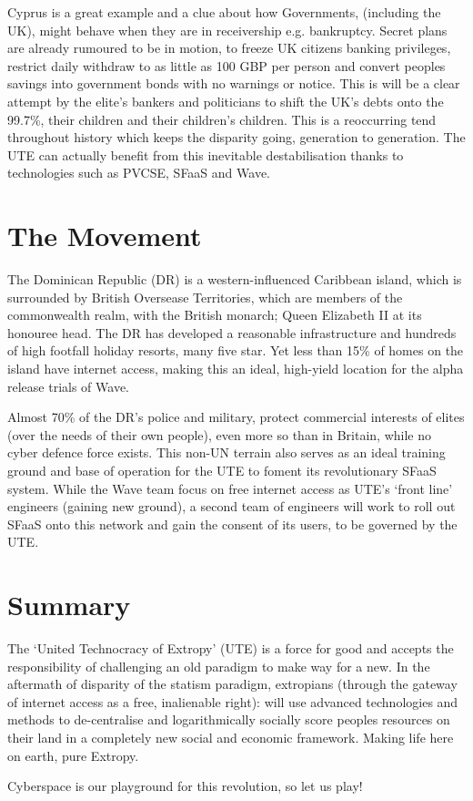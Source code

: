 \documentclass[letterpaper,10pt,openany,oneside,english]{sphinxmanual}
\begin{document}
Cyprus is a great example and a clue about how Governments, (including the UK), might behave when they are in receivership e.g. bankruptcy. Secret plans are already rumoured to be in motion, to freeze UK citizens banking privileges, restrict daily withdraw to as little as 100 GBP per person and convert peoples savings into government bonds with no warnings or notice. This is will be a clear attempt by the elite’s bankers and politicians to shift the UK’s debts onto the 99.7\%, their children and their children’s children. This is a reoccurring tend throughout history which keeps the disparity going, generation to generation. The UTE can actually benefit from this inevitable destabilisation thanks to technologies such as PVCSE, SFaaS and Wave.


\chapter{The Movement}
\label{\detokenize{movement:the-movement}}\label{\detokenize{movement::doc}}
The Dominican Republic (DR) is a western-influenced Caribbean island, which is surrounded by British Oversease Territories, which are members of the commonwealth realm, with the British monarch; Queen Elizabeth II at its honouree head. The DR has developed a reasonable infrastructure and hundreds of high footfall holiday resorts, many five star. Yet less than 15\% of homes on the island have internet access, making this an ideal, high-yield location for the alpha release trials of Wave.

Almost 70\% of the DR’s police and military, protect commercial interests of elites (over the needs of their own people), even more so than in Britain, while no cyber defence force exists. This non-UN terrain also serves as an ideal training ground and base of operation for the UTE to foment its revolutionary SFaaS system. While the Wave team focus on free internet access as UTE’s ‘front line’ engineers (gaining new ground), a second team of engineers will work to roll out SFaaS onto this network and gain the consent of its users, to be governed by the UTE.


\chapter{Summary}
\label{\detokenize{summary:summary}}\label{\detokenize{summary::doc}}
The ‘United Technocracy of Extropy’ (UTE) is a force for good and accepts the responsibility of challenging an old paradigm to make way for a new. In the aftermath of disparity of the statism paradigm, extropians (through the gateway of internet access as a free, inalienable right): will use advanced technologies and methods to de-centralise and logarithmically socially score peoples resources on their land in a completely new social and economic framework. Making life here on earth, pure Extropy.

Cyberspace is our playground for this revolution, so let us play!


\chapter{}
\label{\detokenize{index:document-author-s}}



\renewcommand{\indexname}{Index}
\printindex
\end{document}
